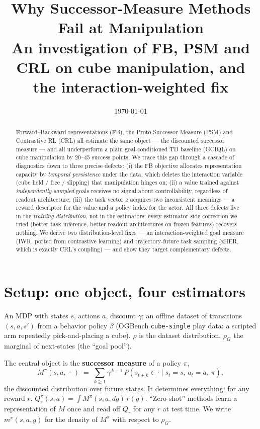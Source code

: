 \documentclass[11pt,a4paper]{article}
\title{\textbf{Why Successor-Measure Methods Fail at Manipulation\\[2pt]
\large An investigation of FB, PSM and CRL on cube manipulation, and the interaction-weighted fix}}
\date{\today}
\begin{document}
\maketitle

\begin{abstract}
\noindent
Forward--Backward representations (FB), the Proto Successor Measure (PSM) and Contrastive RL (CRL)
all estimate the same object --- the discounted successor measure --- and all underperform a plain
goal-conditioned TD baseline (GCIQL) on cube manipulation by 20--45 success points. We trace this
gap through a cascade of diagnostics down to three precise defects: (i) the FB objective allocates
representation capacity by \emph{temporal persistence} under the data, which deletes the
interaction variable (cube held / free / slipping) that manipulation hinges on; (ii) a value
trained against \emph{independently sampled} goals receives no signal about controllability,
regardless of readout architecture; (iii) the task vector $z$ acquires two inconsistent meanings
--- a reward descriptor for the value and a policy index for the actor. All three defects live in
the \emph{training distribution}, not in the estimators: every estimator-side correction we tried
(better task inference, better readout architectures on frozen features) recovers nothing. We
derive two distribution-level fixes --- an interaction-weighted goal measure (IWR, ported from
contrastive learning) and trajectory-future task sampling (zHER, which is exactly CRL's coupling)
--- and show they target complementary defects.
\end{abstract}

\section{Setup: one object, four estimators}\label{sec:setup}

An MDP with states $s$, actions $a$, discount $\gamma$; an offline dataset of transitions
$(s,a,s')$ from a behavior policy $\beta$ (OGBench \texttt{cube-single} play data: a scripted arm
repeatedly pick-and-placing a cube). $\rho$ is the dataset distribution, $\rho_G$ the marginal of
next-states (the ``goal pool'').

The central object is the \textbf{successor measure} of a policy $\pi$,
\begin{equation}
M^{\pi}(s,a,\,\cdot\,) \;=\; \sum_{k\ge 1}\gamma^{\,k-1}\,P\!\left(s_{t+k}\in\cdot \mid s_t=s,\,a_t=a,\,\pi\right),
\label{eq:sm}
\end{equation}
the discounted distribution over future states. It determines everything: for any reward $r$,
$Q^{\pi}_r(s,a)=\int M^{\pi}(s,a,dg)\,r(g)$. ``Zero-shot'' methods learn a representation of $M$
once and read off $Q_r$ for any $r$ at test time. We write $m^{\pi}(s,a,g)$ for the density of
$M^{\pi}$ with respect to $\rho_G$.
\end{document}
